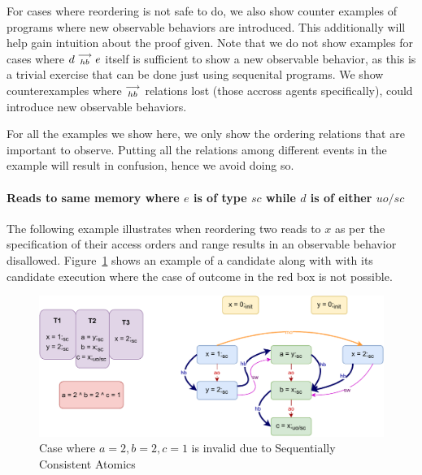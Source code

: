 
    For cases where reordering is not safe to do, we also show counter examples of programs where new observable behaviors are introduced.
    This additionally will help gain intuition about the proof given. 
    Note that we do not show examples for cases where $d\stackrel{\longrightarrow}{_{hb}}e$ itself is sufficient to show a new observable behavior, as this is a trivial exercise that can be done just using sequenital programs.
    We show counterexamples where $\stackrel{\longrightarrow}{_{hb}}$ relations lost (those accross agents specifically), could introduce new observable behaviors. 

    For all the examples we show here, we only show the ordering relations that are important to observe. 
    Putting all the relations among different events in the example will result in confusion, hence we avoid doing so. 

    \paragraph{Reads to same memory where $e$ is of type $sc$ while $d$ is of either $uo/sc$}

        The following example illustrates when reordering two reads to $x$ as per the specification of their access orders and range results in an observable behavior disallowed.
        Figure~\ref{reord_counter:example1(a)} shows an example of a candidate along with with its candidate execution where the case of outcome in the red box is not possible. 
        \begin{figure}[H]
            \centering
            \includegraphics[scale=0.7]{5.InstructionReordering/4.ValidReorderingCandidate/Example0(Rsc-Ruo,sc).pdf}
            \caption{Case where $a = 2, b = 2, c = 1$ is invalid due to Sequentially Consistent Atomics}
            \label{reord_counter:example1(a)}
        \end{figure}
        
